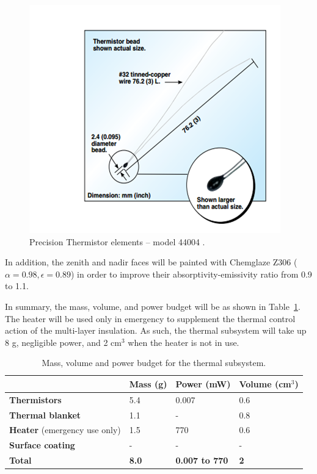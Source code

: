 \documentclass[12pt]{article}
\begin{document}
\begin{figure}[ht]%
\centering
\includegraphics{images/thermal-thermistor}%
\caption{Precision Thermistor elements -- model 44004 .\cite{omega}}%
\label{fig:thermal-thermistor}%
\end{figure}

In addition, the zenith and nadir faces will be painted with Chemglaze Z306 ($\alpha= 0.98, \epsilon = 0.89$) in order to improve their absorptivity-emissivity ratio from 0.9 to 1.1.

In summary, the mass, volume, and power budget will be as shown in Table~\ref{table:thermal-outputs}.  The heater will be used only in emergency to supplement the thermal control action of the multi-layer insulation. As such, the thermal subsystem will take up 8 g, negligible power, and 2 cm$^3$ when the heater is not in use.

\begin{table}[ht]%
\centering
\caption{Mass, volume and power budget for the thermal subsystem.}
\label{table:thermal-outputs}
\begin{tabular}{|l|l|l|l|}\hline
& \textbf{Mass} (g) & \textbf{Power} (mW) & \textbf{Volume} (cm$^3$) \\\hline
\textbf{Thermistors} & 5.4 & 0.007 & 0.6 \\\hline
\textbf{Thermal blanket} & 1.1 & -  & 0.8 \\\hline
\textbf{Heater} (emergency use only) & 1.5 & 770 & 0.6 \\\hline
\textbf{Surface coating} & - & - & - \\\hline
\textbf{Total} & \textbf{8.0} & \textbf{0.007 to 770} & \textbf{2} \\\hline
\end{tabular}
\end{table}
\end{document}
